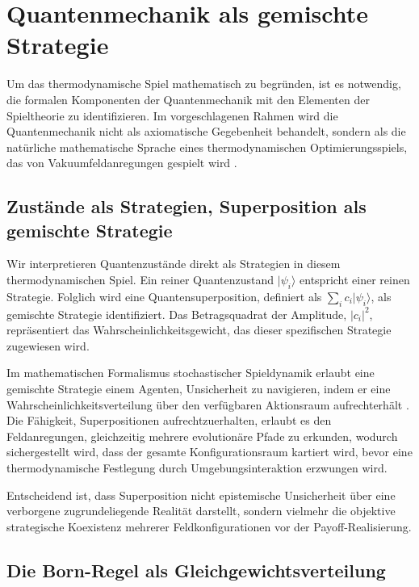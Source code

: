 \documentclass[12pt,a4paper]{article}
\theoremstyle{remark}
\begin{document}
\section{Quantenmechanik als gemischte Strategie}
\label{sec:quantum}

Um das thermodynamische Spiel mathematisch zu begr\"unden, ist es notwendig, die formalen Komponenten der Quantenmechanik mit den Elementen der Spieltheorie zu identifizieren. Im vorgeschlagenen Rahmen wird die Quantenmechanik nicht als axiomatische Gegebenheit behandelt, sondern als die nat\"urliche mathematische Sprache eines thermodynamischen Optimierungsspiels, das von Vakuumfeldanregungen gespielt wird \citep{QuantumStrategies2024}.

\subsection{Zust\"ande als Strategien, Superposition als gemischte Strategie}

Wir interpretieren Quantenzust\"ande direkt als Strategien in diesem thermodynamischen Spiel. Ein reiner Quantenzustand $|\psi_i\rangle$ entspricht einer reinen Strategie. Folglich wird eine Quantensuperposition, definiert als $\sum_i c_i |\psi_i\rangle$, als gemischte Strategie identifiziert. Das Betragsquadrat der Amplitude, $|c_i|^2$, repr\"asentiert das Wahrscheinlichkeitsgewicht, das dieser spezifischen Strategie zugewiesen wird.

Im mathematischen Formalismus stochastischer Spieldynamik erlaubt eine gemischte Strategie einem Agenten, Unsicherheit zu navigieren, indem er eine Wahrscheinlichkeitsverteilung \"uber den verf\"ugbaren Aktionsraum aufrechterh\"alt \citep{QuantumCognition2015}. Die F\"ahigkeit, Superpositionen aufrechtzuerhalten, erlaubt es den Feldanregungen, gleichzeitig mehrere evolution\"are Pfade zu erkunden, wodurch sichergestellt wird, dass der gesamte Konfigurationsraum kartiert wird, bevor eine thermodynamische Festlegung durch Umgebungsinteraktion erzwungen wird.

Entscheidend ist, dass Superposition nicht epistemische Unsicherheit \"uber eine verborgene zugrundeliegende Realit\"at darstellt, sondern vielmehr die objektive strategische Koexistenz mehrerer Feldkonfigurationen vor der Payoff-Realisierung.

\subsection{Die Born-Regel als Gleichgewichtsverteilung}
\end{document}

